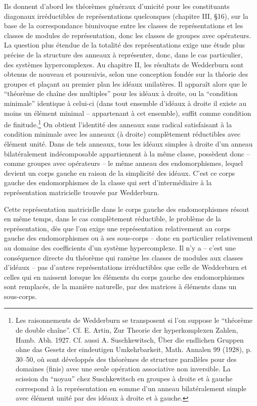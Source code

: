 Ils donnent d'abord les théorèmes généraux d'unicité pour les constituants diagonaux irréductibles de représentations quelconques (chapitre III, \S{}16), sur la base de la correspondance biunivoque entre les classes de représentations et les classes de modules de représentation, donc les classes de groupes avec opérateurs. La question plus étendue de la totalité des représentations exige une étude plus précise de la structure des anneaux à représenter, donc, dans le cas particulier, des systèmes hypercomplexes. Au chapitre II, les résultats de Wedderburn sont obtenus de nouveau et poursuivis, selon une conception fondée sur la théorie des groupes et plaçant au premier plan les idéaux unilatères. Il apparaît alors que le ``théorème de chaîne des multiples'' pour les idéaux à droite, ou la ``condition minimale'' identique à celui-ci (dans tout ensemble d'idéaux à droite il existe au moins un élément minimal -- appartenant à cet ensemble), suffit comme condition de finitude.\footnote{Les raisonnements de Wedderburn se transposent si l'on suppose le ``théorème de double chaîne''. Cf. E. Artin, Zur Theorie der hyperkomplexen Zahlen, Hamb. Abh. 1927. Cf. aussi A. Suschkewitsch, Über die endlichen Gruppen ohne das Gesetz der eindeutigen Umkehrbarkeit, Math. Annalen 99 (1928), p. 30--50, où sont développés des théorèmes de structure parallèles pour des domaines (finis) avec une seule opération associative non inversible. La scission du ``noyau'' chez Suschkewitsch en groupes à droite et à gauche correspond à la représentation en somme d'un anneau bilatéralement simple avec élément unité par des idéaux à droite et à gauche.} On obtient l'identité des anneaux sans radical satisfaisant à la condition minimale avec les anneaux (à droite) complètement réductibles avec élément unité. Dans de tels anneaux, tous les idéaux simples à droite d'un anneau bilatéralement indécomposable appartiennent à la même classe, possèdent donc -- comme groupes avec opérateurs -- le même anneau des endomorphismes, lequel devient un corps gauche en raison de la simplicité des idéaux. C'est ce corps gauche des endomorphismes de la classe qui sert d'intermédiaire à la représentation matricielle trouvée par Wedderburn.

Cette représentation matricielle dans le corps gauche des endomorphismes résout en même temps, dans le cas complètement réductible, le problème de la représentation, dès que l'on exige une représentation relativement au corps gauche des endomorphismes ou à ses sous-corps -- donc en particulier relativement au domaine des coefficients d'un système hypercomplexe. Il n'y a -- c'est une conséquence directe du théorème qui ramène les classes de modules aux classes d'idéaux -- pas d'autres représentations irréductibles que celle de Wedderburn et celles qui en naissent lorsque les éléments du corps gauche des endomorphismes sont remplacés, de la manière naturelle, par des matrices à éléments dans un sous-corps.


